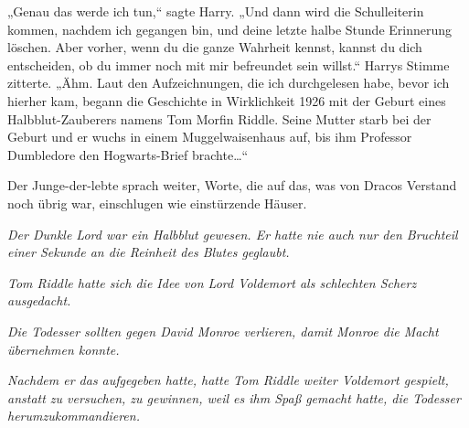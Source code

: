 „Genau das werde ich tun,“ sagte Harry. „Und dann wird die Schulleiterin kommen, nachdem ich gegangen bin, und deine letzte halbe Stunde Erinnerung löschen. Aber vorher, wenn du die ganze Wahrheit kennst, kannst du dich entscheiden, ob du immer noch mit mir befreundet sein willst.“
Harrys Stimme zitterte.
„Ähm. Laut den Aufzeichnungen, die ich durchgelesen habe, bevor ich hierher kam, begann die Geschichte in Wirklichkeit 1926 mit der Geburt eines Halbblut-Zauberers namens Tom Morfin Riddle. Seine Mutter starb bei der Geburt und er wuchs in einem Muggelwaisenhaus auf, bis ihm Professor Dumbledore den Hogwarts-Brief brachte…“

Der Junge-der-lebte sprach weiter, Worte, die auf das, was von Dracos Verstand noch übrig war, einschlugen wie einstürzende Häuser.

\emph{Der Dunkle Lord war ein Halbblut gewesen. Er hatte nie auch nur den Bruchteil einer Sekunde an die Reinheit des Blutes geglaubt.}

\emph{Tom Riddle hatte sich die Idee von Lord Voldemort als schlechten Scherz ausgedacht.}

\emph{Die Todesser sollten gegen David Monroe verlieren, damit Monroe die Macht übernehmen konnte.}

\emph{Nachdem er das aufgegeben hatte, hatte Tom Riddle weiter Voldemort gespielt, anstatt zu versuchen, zu gewinnen, weil es ihm Spaß gemacht hatte, die Todesser herumzukommandieren.}

